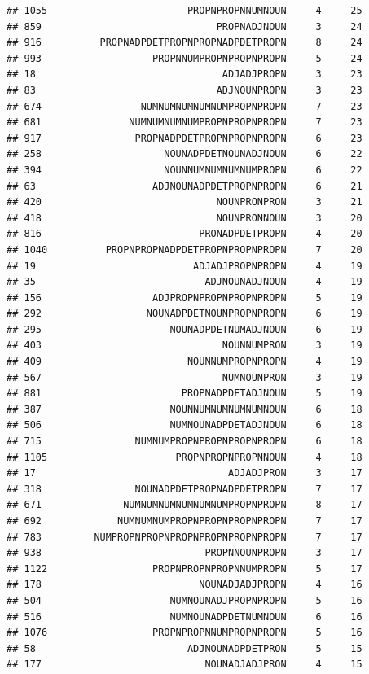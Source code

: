 \documentclass[]{article}
\begin{document}
\begin{verbatim}
## 1055                        PROPNPROPNNUMNOUN     4     25
## 859                              PROPNADJNOUN     3     24
## 916          PROPNADPDETPROPNPROPNADPDETPROPN     8     24
## 993                   PROPNNUMPROPNPROPNPROPN     5     24
## 18                                ADJADJPROPN     3     23
## 83                               ADJNOUNPROPN     3     23
## 674                 NUMNUMNUMNUMNUMPROPNPROPN     7     23
## 681               NUMNUMNUMNUMPROPNPROPNPROPN     7     23
## 917                PROPNADPDETPROPNPROPNPROPN     6     23
## 258                     NOUNADPDETNOUNADJNOUN     6     22
## 394                     NOUNNUMNUMNUMNUMPROPN     6     22
## 63                    ADJNOUNADPDETPROPNPROPN     6     21
## 420                              NOUNPRONPRON     3     21
## 418                              NOUNPRONNOUN     3     20
## 816                           PRONADPDETPROPN     4     20
## 1040          PROPNPROPNADPDETPROPNPROPNPROPN     7     20
## 19                           ADJADJPROPNPROPN     4     19
## 35                             ADJNOUNADJNOUN     4     19
## 156                   ADJPROPNPROPNPROPNPROPN     5     19
## 292                  NOUNADPDETNOUNPROPNPROPN     6     19
## 295                      NOUNADPDETNUMADJNOUN     6     19
## 403                               NOUNNUMPRON     3     19
## 409                         NOUNNUMPROPNPROPN     4     19
## 567                               NUMNOUNPRON     3     19
## 881                        PROPNADPDETADJNOUN     5     19
## 387                      NOUNNUMNUMNUMNUMNOUN     6     18
## 506                      NUMNOUNADPDETADJNOUN     6     18
## 715                NUMNUMPROPNPROPNPROPNPROPN     6     18
## 1105                      PROPNPROPNPROPNNOUN     4     18
## 17                                 ADJADJPRON     3     17
## 318                NOUNADPDETPROPNADPDETPROPN     7     17
## 671              NUMNUMNUMNUMNUMNUMPROPNPROPN     8     17
## 692             NUMNUMNUMPROPNPROPNPROPNPROPN     7     17
## 783         NUMPROPNPROPNPROPNPROPNPROPNPROPN     7     17
## 938                            PROPNNOUNPROPN     3     17
## 1122                  PROPNPROPNPROPNNUMPROPN     5     17
## 178                           NOUNADJADJPROPN     4     16
## 504                      NUMNOUNADJPROPNPROPN     5     16
## 516                      NUMNOUNADPDETNUMNOUN     6     16
## 1076                  PROPNPROPNNUMPROPNPROPN     5     16
## 58                          ADJNOUNADPDETPRON     5     15
## 177                            NOUNADJADJPRON     4     15

\end{verbatim}
\end{document}
